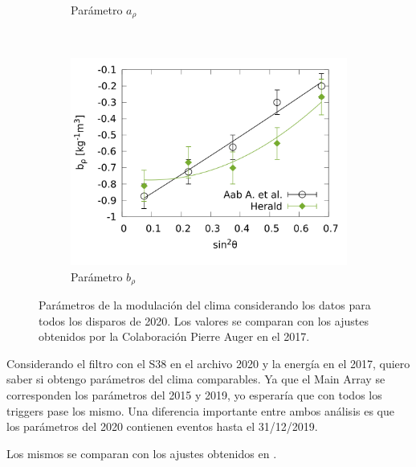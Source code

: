 \begin{figure}[H]
\begin{subfigure}[b]{0.5\textwidth}
          \caption{Parámetro $a_{\rho}$ }
          \label{fig:arho_2020_1EeV}
          \end{subfigure}\\
          \begin{subfigure}[b]{\textwidth}
          \centering
          \includegraphics[width=0.5\linewidth]{../03_IntroduccionReport/params/brho_2020_above_1EeV.png}
          \caption{Parámetro  $b_\rho$   }
          \label{fig:brho_2020_1EeV}
          \end{subfigure}%
          \caption{Parámetros de la modulación del clima considerando los datos para todos los disparos de 2020. Los valores se comparan con los ajustes obtenidos por la Colaboración  Pierre Auger en el 2017.}\label{fig:parameters_2020_1EeV}
        \end{figure}



      Considerando el filtro con el S38 en el archivo 2020 y la energía en el 2017, quiero saber si obtengo parámetros  del clima comparables. Ya que el Main Array se corresponden los parámetros del 2015 y 2019, yo esperaría que con todos los triggers pase los mismo. Una diferencia importante entre ambos análisis es que los parámetros del 2020 contienen eventos hasta el 31/12/2019.
      
      Los mismos se comparan con los ajustes obtenidos en \cite{aab2017impact}.

